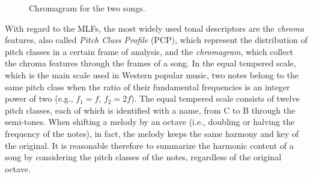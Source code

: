 \begin{figure}[tb]
	\centering
	 \hfil
	\caption{Chromagram for the two songs.}
	\label{fig:LLFs:chroma}          
\end{figure}


With regard to the MLFs, the most widely used tonal descriptors are the \textit{chroma} features, also called \textit{Pitch Class Profile} (PCP), which represent the distribution of pitch classes in a certain frame of analysis, and the \textit{chromagram}, which collect the chroma features through the frames of a song. In the equal tempered scale, which is the main scale used in Western popular music, two notes belong to the same pitch class when the ratio of their fundamental frequencies is an integer power of two (e.g., $f_1=f$, $f_2=2f$). The equal tempered scale consists of twelve pitch classes, each of which is identified with a name, from C to B through the semi-tones. When shifting a melody by an octave (i.e., doubling or halving the frequency of the notes), in fact, the melody keeps the same harmony and key of the original. It is reasonable therefore to summarize the harmonic content of a song by considering the pitch classes of the notes, regardless of the original octave.



